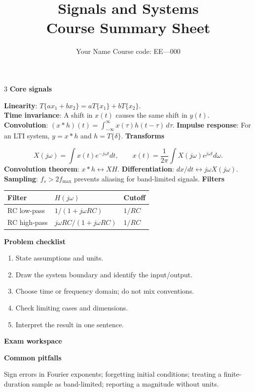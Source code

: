 \documentclass[landscape,a4paper,8pt]{article}
\title{Signals and Systems\\\large Course Summary Sheet}
\author{Your Name \quad Course code: EE---000}
\date{}
\newcommand{\topic}[1]{\vspace{0.4em}\textcolor{blue!60!black}{\large\bfseries #1}\par\smallskip}
\newcommand{\key}[1]{\textbf{#1}: }
\begin{document}
\maketitle
\begin{multicols*}{3}
\topic{Core signals}
\key{Linearity} $T\{a x_1+b x_2\}=aT\{x_1\}+bT\{x_2\}$.\\
\key{Time invariance} A shift in $x(t)$ causes the same shift in $y(t)$.
\key{Convolution} $(x*h)(t)=\int_{-\infty}^{\infty}x(\tau)h(t-\tau)\,d\tau$.
\key{Impulse response} For an LTI system, $y=x*h$ and $h=T\{\delta\}$.
\topic{Transforms}
\[
X(j\omega)=\int x(t)e^{-j\omega t}dt,\qquad
x(t)=\frac1{2\pi}\int X(j\omega)e^{j\omega t}d\omega.
\]
\key{Convolution theorem} $x*h\leftrightarrow XH$.
\key{Differentiation} $dx/dt\leftrightarrow j\omega X(j\omega)$.
\key{Sampling} $f_s>2f_{\max}$ prevents aliasing for band-limited signals.
\topic{Filters}
\begin{tabular}{@{}lll@{}}\toprule
Filter & $H(j\omega)$ & Cutoff\\\midrule
RC low-pass & $1/(1+j\omega RC)$ & $1/RC$\\
RC high-pass & $j\omega RC/(1+j\omega RC)$ & $1/RC$\\
\bottomrule\end{tabular}
\topic{Problem checklist}
\begin{enumerate}
\item State assumptions and units.
\item Draw the system boundary and identify the input/output.
\item Choose time or frequency domain; do not mix conventions.
\item Check limiting cases and dimensions.
\item Interpret the result in one sentence.
\end{enumerate}
\topic{Exam workspace}
\vspace{7cm}
\topic{Common pitfalls}
Sign errors in Fourier exponents; forgetting initial conditions; treating a
finite-duration sample as band-limited; reporting a magnitude without units.
\end{multicols*}
\end{document}
